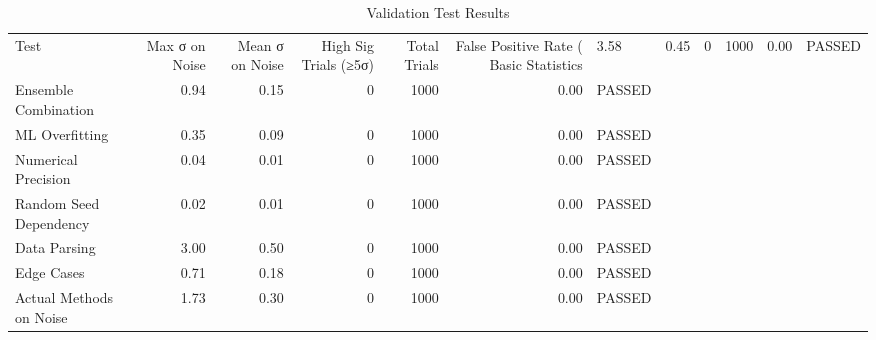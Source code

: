 \begin{table}
\caption{Validation Test Results}
\label{tab:validation_results}
\begin{tabular}{lrrrrrl}
\toprule
Test & Max σ on Noise & Mean σ on Noise & High Sig Trials (≥5σ) & Total Trials & False Positive Rate (%
\midrule
Basic Statistics & 3.58 & 0.45 & 0 & 1000 & 0.00 & PASSED \\
Ensemble Combination & 0.94 & 0.15 & 0 & 1000 & 0.00 & PASSED \\
ML Overfitting & 0.35 & 0.09 & 0 & 1000 & 0.00 & PASSED \\
Numerical Precision & 0.04 & 0.01 & 0 & 1000 & 0.00 & PASSED \\
Random Seed Dependency & 0.02 & 0.01 & 0 & 1000 & 0.00 & PASSED \\
Data Parsing & 3.00 & 0.50 & 0 & 1000 & 0.00 & PASSED \\
Edge Cases & 0.71 & 0.18 & 0 & 1000 & 0.00 & PASSED \\
Actual Methods on Noise & 1.73 & 0.30 & 0 & 1000 & 0.00 & PASSED \\
\bottomrule
\end{tabular}
\end{table}
